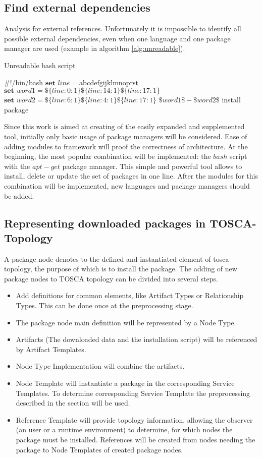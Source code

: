 \subsection{Find external dependencies}
Analysis for external references.
Unfortunately it is impossible to identify all possible external dependencies, even when one language and one package manager are used (example in algorithm \ref{alg:unreadable}).
\begin{Algorithmus} 
	\caption{Unreadable bash script}
	\label{alg:unreadable}
	\begin{algorithmic}
		\State	\#!/bin/bash
		\State	$\textbf{set } line = $abcdefgijklmnoprst
		\State	$\textbf{set } word1 = \$\{line:0:1\}\$\{line:14:1\}\$\{line:17:1\}$ 
		\State  $\textbf{set } word2 = \$\{line:6:1\}\$\{line:4:1\}\$\{line:17:1\}$
		\State  $\$word1\$-\$word2\$$ install package
	\end{algorithmic}
\end{Algorithmus}   
Since this work is aimed at creating of the easily expanded and supplemented tool, initially only basic usage of package managers will be considered.
Ease of adding modules to framework will proof the correctness of architecture.
At the beginning, the most popular combination will be implemented: the $bash$ script with the $apt-get$ package manager.
This simple and powerful tool allows to install, delete or update the set of packages in one line.
After the modules for this combination will be implemented, new languages and package managers should be added.
\subsection{Representing downloaded packages in TOSCA-Topology} \label{subs:repres}
A package node denotes to the defined and instantiated element of \gls{tosca} topology, the purpose of which is to install the package.
The adding of new package nodes to TOSCA topology can be divided into several steps.
\begin{itemize}
	\item Add definitions for common elements, like Artifact Types or Relationship Types. 
		This can be done once at the preprocessing stage.
	\item The package node main definition will be represented by a Node Type. 
	\item Artifacts (The downloaded data and the installation script) will be referenced by Artifact Templates.
	\item Node Type Implementation will combine the artifacts.
	\item Node Template will instantiate a package in the corresponding Service Templates.
		To determine corresponding Service Template the preprocessing described in the section  will be used.
	\item Reference Template will provide topology information, allowing the observer (an user or a runtime environment) to determine, for which nodes the package must be installed.
		References will be created from nodes needing the package to Node Templates of created package nodes.
\end{itemize}
